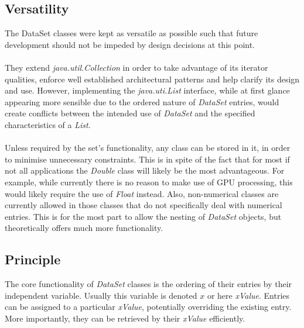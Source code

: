\documentclass[main.tex]{subfiles}
\begin{document}
    \subsection{Versatility}
    
      The DataSet classes were kept as versatile as possible such that future development should not be impeded by design decisions at this point. 
      \\\\
      They extend \textit{java.util.Collection} in order to take advantage of its iterator qualities, enforce well established architectural patterns and help clarify its design and use. However, implementing the \textit{java.uti.List} interface, while at first glance appearing more sensible due to the ordered nature of \textit{DataSet} entries, would create conflicts between the intended use of  \textit{DataSet} and the specified characteristics of a \textit{List}.
      \\\\
      Unless required by the set's functionality, any class can be stored in it, in order to minimise unnecessary constraints. This is in spite of the fact that for most if not all applications the \textit{Double} class will likely be the most advantageous. For example, while currently there is no reason to make use of GPU processing, this would likely require the use of \textit{Float} instead. Also, non-numerical classes are currently allowed in those classes that do not specifically deal with numerical entries. This is for the most part to allow the nesting of \textit{DataSet} objects, but theoretically offers much more functionality.
    
    \subsection{Principle}
      \label{sec:impl:dataPrinciple}
      
      The core functionality of \textit{DataSet} classes is the ordering of their entries by their independent variable. Usually this variable is denoted $x$ or here \textit{xValue}. Entries can be assigned to a particular \textit{xValue}, potentially overriding the existing entry. More importantly, they can be retrieved by their \textit{xValue} efficiently. 
      
\end{document}
